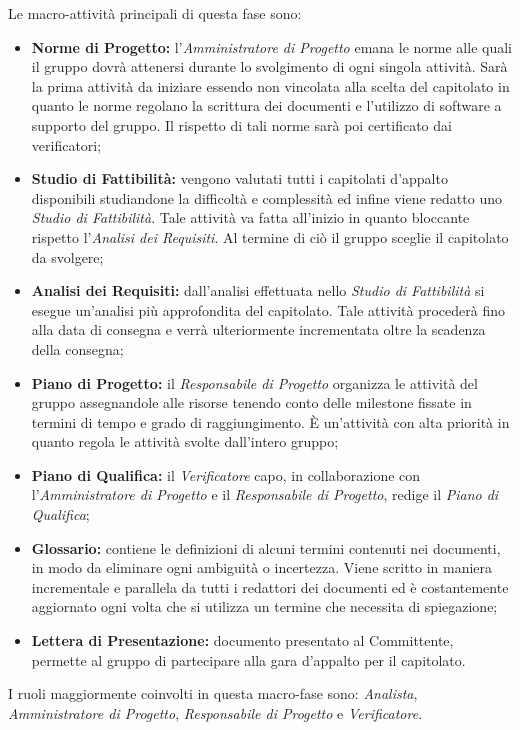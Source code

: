 \noindent Le macro-attività principali di questa fase sono:
\begin{itemize}
	\item \textbf{Norme di Progetto:} l'\textit{Amministratore di Progetto} emana le norme alle quali il gruppo dovrà attenersi durante lo svolgimento di ogni singola attività. Sarà la prima attività da iniziare essendo non vincolata alla scelta del capitolato in quanto le norme regolano la scrittura dei documenti e l'utilizzo di software a supporto del gruppo. Il rispetto di tali norme sarà poi certificato dai verificatori;
	\item \textbf{Studio di Fattibilità:} vengono valutati tutti i capitolati d'appalto disponibili studiandone la difficoltà e complessità	ed infine viene redatto uno \textit{Studio di Fattibilità}. Tale attività va fatta all'inizio in quanto bloccante rispetto l'\textit{Analisi dei Requisiti}. Al termine di ciò il gruppo sceglie il capitolato da svolgere;
	\item \textbf{Analisi dei Requisiti:} dall'analisi effettuata nello \textit{Studio di Fattibilità} si esegue un'analisi più approfondita del capitolato.	Tale attività procederà fino alla data di consegna e verrà ulteriormente incrementata oltre la scadenza della consegna;
	\item \textbf{Piano di Progetto:} il \textit{Responsabile di Progetto} organizza le attività del gruppo assegnandole alle risorse tenendo conto delle milestone fissate in termini di tempo e grado di raggiungimento. È un'attività con alta priorità in quanto regola le attività svolte dall'intero gruppo;
	\item \textbf{Piano di Qualifica:} il \textit{Verificatore} capo, in collaborazione con l'\textit{Amministratore di Progetto} e il \textit{Responsabile di Progetto}, redige il \textit{Piano di Qualifica}; 
	\item \textbf{Glossario:} contiene le definizioni di alcuni termini contenuti nei documenti, in modo da eliminare ogni ambiguità o incertezza. Viene scritto in maniera incrementale e parallela da tutti i redattori dei documenti ed è costantemente aggiornato ogni volta che si utilizza un termine che necessita di spiegazione;
	\item \textbf{Lettera di Presentazione:} documento presentato al Committente, permette al gruppo di partecipare alla gara d'appalto per il capitolato.	
\end{itemize}
I ruoli maggiormente coinvolti in questa macro-fase sono: \textit{Analista}, \textit{Amministratore di Progetto}, \textit{Responsabile di Progetto} e \textit{Verificatore}.
\newpage
